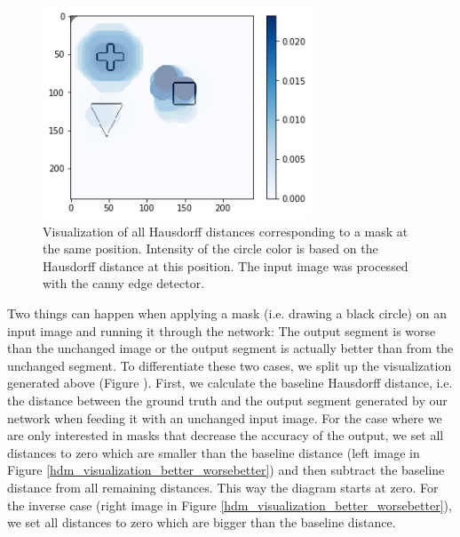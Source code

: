\begin{figure}[H]
    \centering
    \includegraphics[width=8cm]{chapters/06_hdm/visualization/hdm_raw.png}
    \caption{Visualization of all Hausdorff distances corresponding to a mask at the same position. Intensity of the circle color is based on the Hausdorff distance at this position. The input image was processed with the canny edge detector.}
    \label{hdm_visualization_raw}
\end{figure}

Two things can happen when applying a mask (i.e. drawing a black circle) on an input image and running it through the network: The output segment is worse than the unchanged image or the output segment is actually better than from the unchanged segment. To differentiate these two cases, we split up the visualization generated above (Figure \label{hdm_visualization_raw}). First, we calculate the baseline Hausdorff distance, i.e. the distance between the ground truth and the output segment generated by our network when feeding it with an unchanged input image. For the case where we are only interested in masks that decrease the accuracy of the output, we set all distances to zero which are smaller than the baseline distance (left image in Figure \ref{hdm_visualization_better_worsebetter}) and then subtract the baseline distance from all remaining distances. This way the diagram starts at zero. For the inverse case (right image in Figure \ref{hdm_visualization_better_worsebetter}), we set all distances to zero which are bigger than the baseline distance.

